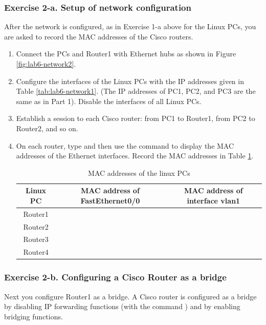 \subsubsection{Exercise 2-a. Setup of network configuration}
After the network is configured, as in Exercise 1-a above for the Linux PCs, you are asked to record the MAC addresses of the Cisco routers.
\begin{enumerate}
	\item Connect the PCs and Router1 with Ethernet hubs as shown in Figure \ref{fig:lab6-network2}.
	\item Configure the  interfaces of the Linux PCs with the IP addresses given in Table \ref{tab:lab6-network1}. (The IP addresses of PC1, PC2, and PC3 are the same as in Part 1). Disable the  interfaces of all Linux PCs.
	\item Establish a  session to each Cisco router: from PC1 to Router1, from PC2 to Router2, and so on.
	\item On each router, type  and then use the command  to display the MAC addresses of the Ethernet interfaces. Record the MAC addresses in Table \ref{tab:lab6-macs-routers}.
		\begin{table}[h!t]
			\centering
			\begin{tabular}{| c | c | c |}	
				\hline
				\textbf{Linux PC} & \textbf{MAC address of FastEthernet0/0} & \textbf{MAC address of interface vlan1} \\ \hline
				Router1 &  &  \\ 
				Router2 &  &  \\
				Router3 &  &  \\
				Router4 &  &  \\ \hline
			\end{tabular}
			\caption{MAC addresses of the linux PCs}
			\label{tab:lab6-macs-routers}
		\end{table}
\end{enumerate}

\subsubsection{Exercise 2-b. Configuring a Cisco Router as a bridge}

Next you configure Router1 as a bridge. A Cisco router is configured as a bridge by disabling IP forwarding functions (with the command ) and by enabling bridging functions.

